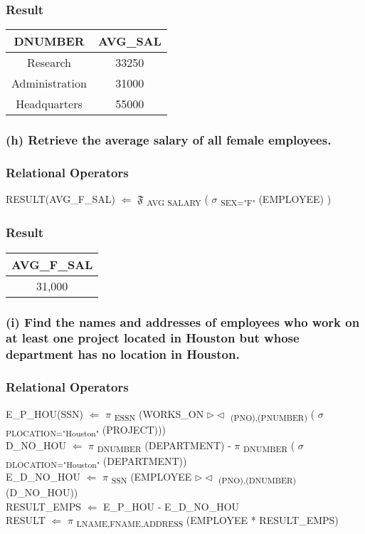 \documentclass[11pt, oneside]{article}   	%
\begin{document}
\subsubsection*{Result}
\begin{center}
\begin{tabular}{ c | c }
  DNUMBER & AVG\_SAL  \\ \hline
  Research & 33250 \\
  Administration & 31000 \\
  Headquarters & 55000 \\
\end{tabular}
\end{center}

\subsubsection*{(h) Retrieve the average salary of all female employees.}
\subsubsection*{Relational Operators}
RESULT(AVG\_F\_SAL) $\Leftarrow$ $\mathfrak{F}$ \textsubscript{AVG SALARY} ( $\sigma$ \textsubscript{SEX="F"} (EMPLOYEE) )

\subsubsection*{Result}
\begin{center}
\begin{tabular}{ c }
  AVG\_F\_SAL \\ \hline
  31,000 \\
\end{tabular}
\end{center}

\subsubsection*{(i) Find the names and addresses of employees who work on at least one project located in Houston but whose department has no location in Houston.}
\subsubsection*{Relational Operators}
E\_P\_HOU(SSN) $\Leftarrow$ $\pi$ \textsubscript{ESSN} (WORKS\_ON $\rhd\lhd$ \textsubscript{(PNO),(PNUMBER)} ( $\sigma$ \textsubscript{PLOCATION="Houston"} (PROJECT)))\\
D\_NO\_HOU $\Leftarrow$ $\pi$ \textsubscript{DNUMBER} (DEPARTMENT) - $\pi$ \textsubscript{DNUMBER} ( $\sigma$ \textsubscript{DLOCATION="Houston"} (DEPARTMENT))\\
E\_D\_NO\_HOU $\Leftarrow$ $\pi$ \textsubscript{SSN} (EMPLOYEE  $\rhd\lhd$ \textsubscript{(PNO),(DNUMBER)} (D\_NO\_HOU))\\
RESULT\_EMPS $\Leftarrow$ E\_P\_HOU - E\_D\_NO\_HOU \\
RESULT $\Leftarrow$ $\pi$ \textsubscript{LNAME,FNAME,ADDRESS} (EMPLOYEE * RESULT\_EMPS)
\end{document}
